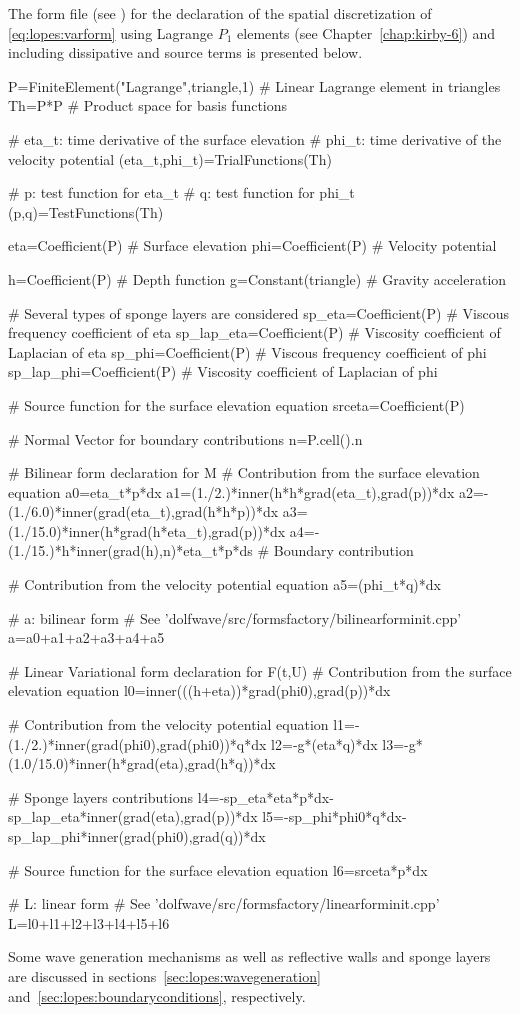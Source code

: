 The \ufl form file (see ) for the
declaration of the spatial discretization of \eqref{eq:lopes:varform}
using Lagrange $P_1$ elements (see Chapter~\ref{chap:kirby-6}) and
including dissipative and source terms is presented below.
\begin{python}
P=FiniteElement("Lagrange",triangle,1) # Linear Lagrange element in triangles
Th=P*P # Product space for basis functions

# eta_t: time derivative of the surface elevation
# phi_t: time derivative of the velocity potential
(eta_t,phi_t)=TrialFunctions(Th)

# p: test function for eta_t
# q: test function for phi_t
(p,q)=TestFunctions(Th)

eta=Coefficient(P) # Surface elevation
phi=Coefficient(P) # Velocity potential

h=Coefficient(P) # Depth function
g=Constant(triangle) # Gravity acceleration

# Several types of sponge layers are considered
sp_eta=Coefficient(P) # Viscous frequency coefficient of eta
sp_lap_eta=Coefficient(P) # Viscosity coefficient of Laplacian of eta
sp_phi=Coefficient(P) # Viscous frequency coefficient of phi
sp_lap_phi=Coefficient(P) # Viscosity coefficient of Laplacian of phi

# Source function for the surface elevation equation
srceta=Coefficient(P)

# Normal Vector for boundary contributions
n=P.cell().n

# Bilinear form declaration for M
# Contribution from the surface elevation equation
a0=eta_t*p*dx
a1=(1./2.)*inner(h*h*grad(eta_t),grad(p))*dx
a2=-(1./6.0)*inner(grad(eta_t),grad(h*h*p))*dx
a3=(1./15.0)*inner(h*grad(h*eta_t),grad(p))*dx
a4=-(1./15.)*h*inner(grad(h),n)*eta_t*p*ds # Boundary contribution

# Contribution from the velocity potential equation
a5=(phi_t*q)*dx

# a: bilinear form
# See 'dolfwave/src/formsfactory/bilinearforminit.cpp'
a=a0+a1+a2+a3+a4+a5

# Linear Variational form declaration for F(t,U)
# Contribution from the surface elevation equation
l0=inner(((h+eta))*grad(phi0),grad(p))*dx

# Contribution from the velocity potential equation
l1=-(1./2.)*inner(grad(phi0),grad(phi0))*q*dx
l2=-g*(eta*q)*dx
l3=-g*(1.0/15.0)*inner(h*grad(eta),grad(h*q))*dx

# Sponge layers contributions
l4=-sp_eta*eta*p*dx-sp_lap_eta*inner(grad(eta),grad(p))*dx
l5=-sp_phi*phi0*q*dx-sp_lap_phi*inner(grad(phi0),grad(q))*dx

# Source function for the surface elevation equation
l6=srceta*p*dx

# L: linear form
# See 'dolfwave/src/formsfactory/linearforminit.cpp'
L=l0+l1+l2+l3+l4+l5+l6
\end{python}
Some wave generation mechanisms as well as reflective walls
 and sponge layers are discussed in
 sections~\ref{sec:lopes:wavegeneration}
 and~\ref{sec:lopes:boundaryconditions},
 respectively.


